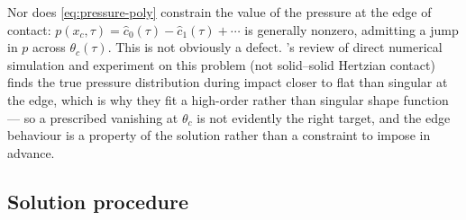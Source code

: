 Nor does \eqref{eq:pressure-poly} constrain the value of the pressure at the edge of contact: $p(x_c,\tau)=\hat c_0(\tau)-\hat c_1(\tau)+\cdots$ is generally nonzero, admitting a jump in $p$ across $\theta_c(\tau)$. This is not obviously a defect. \cite{AlventosaEtAl2023}'s review of direct numerical simulation and experiment on this problem (not solid--solid Hertzian contact) finds the true pressure distribution during impact closer to flat than singular at the edge, which is why they fit a high-order rather than singular shape function --- so a prescribed vanishing at $\theta_c$ is not evidently the right target, and the edge behaviour is a property of the solution rather than a constraint to impose in advance.

\subsection{Solution procedure}
\label{subsec:newton}

